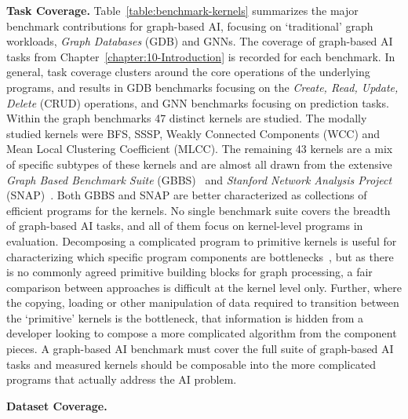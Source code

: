 \textbf{Task Coverage.}
Table~\ref{table:benchmark-kernels} summarizes the major benchmark contributions for graph-based AI, focusing on `traditional' graph workloads, \textit{Graph Databases} (GDB) and GNNs.
The coverage of graph-based AI tasks from Chapter~\ref{chapter:10-Introduction} is recorded for each benchmark. 
In general, task coverage clusters around the core operations of the underlying programs, and results in GDB benchmarks focusing on the \textit{Create, Read, Update, Delete} (CRUD) operations, and GNN benchmarks focusing on prediction tasks.
Within the graph benchmarks 47 distinct kernels are studied. 
The modally studied kernels were BFS, SSSP, Weakly Connected Components (WCC) and Mean Local Clustering Coefficient (MLCC). 
The remaining 43 kernels are a mix of specific subtypes of these kernels and are almost all drawn from the extensive \textit{Graph Based Benchmark Suite} (GBBS)~\cite{Dhulipala2020, Dhulipala2021} and \textit{Stanford Network Analysis Project} (SNAP)~\cite{Leskovec2016}.
Both GBBS and SNAP are better characterized as collections of efficient programs for the kernels.
No single benchmark suite covers the breadth of graph-based AI tasks, and all of them focus on kernel-level programs in evaluation. 
Decomposing a complicated program to primitive kernels is useful for characterizing which specific program components are bottlenecks~\cite{Saavedra1996}, but as there is no commonly agreed primitive building blocks for graph processing, a fair comparison between approaches is difficult at the kernel level only.
Further, where the copying, loading or other manipulation of data required to transition between the `primitive' kernels is the bottleneck, that information is hidden from a developer looking to compose a more complicated algorithm from the component pieces. 
A graph-based AI benchmark must cover the full suite of graph-based AI tasks and measured kernels should be composable into the more complicated programs that actually address the AI problem. 


\textbf{Dataset Coverage.}

%
%

